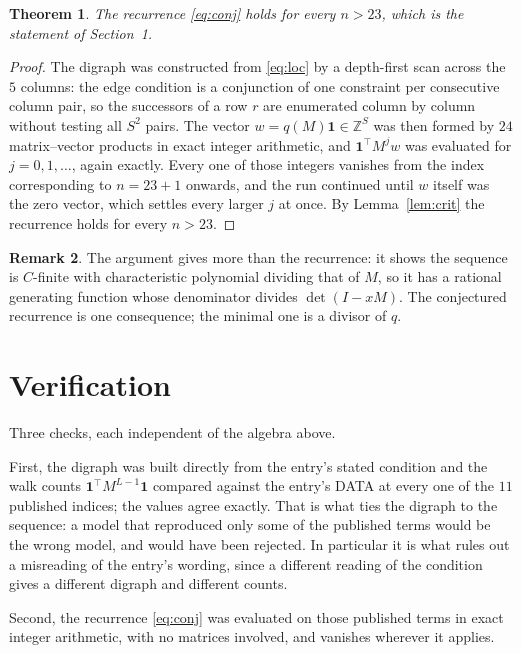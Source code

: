 \documentclass[11pt,a4paper]{article}
\theoremstyle{plain}
\newtheorem{theorem}{Theorem}
\theoremstyle{definition}
\newtheorem{remark}[theorem]{Remark}
\begin{document}
\begin{theorem}
The recurrence \eqref{eq:conj} holds for every $n>23$, which is the statement of
Section~1.
\end{theorem}

\begin{proof}
The digraph was constructed from \eqref{eq:loc} by a depth-first scan across the $5$
columns: the edge condition is a conjunction of one constraint per consecutive column
pair, so the successors of a row $r$ are enumerated column by column without testing all
$S^2$ pairs. The vector $w=q(M)\mathbf{1}\in\mathbb{Z}^{S}$ was then formed by $24$
matrix--vector products in exact integer arithmetic, and $\mathbf{1}^{\!\top}M^{j}w$ was
evaluated for $j=0,1,\dots$, again exactly. Every one of those integers vanishes from the
index corresponding to $n=23+1$ onwards, and the run continued until $w$ itself was the
zero vector, which settles every larger $j$ at once. By Lemma~\ref{lem:crit} the recurrence
holds for every $n>23$.
\end{proof}

\begin{remark}
The argument gives more than the recurrence: it shows the sequence is $C$-finite with
characteristic polynomial dividing that of $M$, so it has a rational generating function
whose denominator divides $\det(I-xM)$. The conjectured recurrence is one consequence; the
minimal one is a divisor of $q$.
\end{remark}

\section{Verification}

Three checks, each independent of the algebra above.

First, the digraph was built directly from the entry's stated condition and the walk counts
$\mathbf{1}^{\!\top}M^{L-1}\mathbf{1}$ compared against the entry's DATA at
every one of the $11$ published indices; the values agree exactly. That is what ties
the digraph to the sequence: a model that reproduced only some of the published terms would
be the wrong model, and would have been rejected. In particular it is what rules out a
misreading of the entry's wording, since a different reading of the condition gives a
different digraph and different counts.

Second, the recurrence \eqref{eq:conj} was evaluated on those published terms in exact
integer arithmetic, with no matrices involved, and vanishes wherever it applies.
\end{document}
